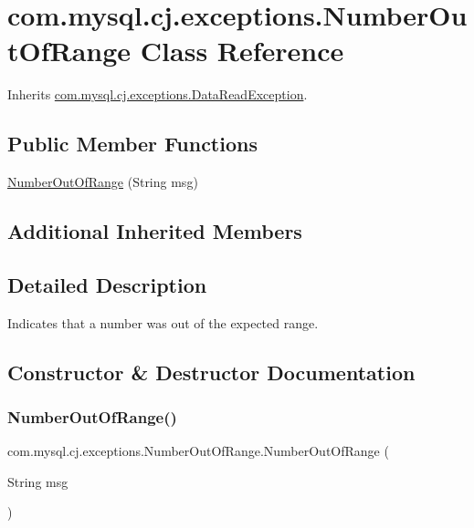\hypertarget{classcom_1_1mysql_1_1cj_1_1exceptions_1_1_number_out_of_range}{}\section{com.\+mysql.\+cj.\+exceptions.\+Number\+Out\+Of\+Range Class Reference}
\label{classcom_1_1mysql_1_1cj_1_1exceptions_1_1_number_out_of_range}


Inherits \mbox{\hyperlink{classcom_1_1mysql_1_1cj_1_1exceptions_1_1_data_read_exception}{com.\+mysql.\+cj.\+exceptions.\+Data\+Read\+Exception}}.

\subsection*{Public Member Functions}
\begin{DoxyCompactItemize}
\item 
\mbox{\hyperlink{classcom_1_1mysql_1_1cj_1_1exceptions_1_1_number_out_of_range_ab96e11fba1a6337ec6b56e9f4a552f1b}{Number\+Out\+Of\+Range}} (String msg)
\end{DoxyCompactItemize}
\subsection*{Additional Inherited Members}


\subsection{Detailed Description}
Indicates that a number was out of the expected range. 

\subsection{Constructor \& Destructor Documentation}
\mbox{\label{classcom_1_1mysql_1_1cj_1_1exceptions_1_1_number_out_of_range_ab96e11fba1a6337ec6b56e9f4a552f1b}} 
\subsubsection{\texorpdfstring{Number\+Out\+Of\+Range()}{NumberOutOfRange()}}
{\footnotesize\ttfamily com.\+mysql.\+cj.\+exceptions.\+Number\+Out\+Of\+Range.\+Number\+Out\+Of\+Range (\begin{DoxyParamCaption}\item[{String}]{msg }\end{DoxyParamCaption})}




